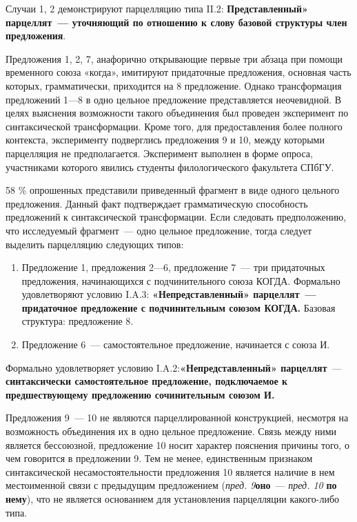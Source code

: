 \documentclass{kursa4}
\begin{document}
{      Случаи 1, 2 демонстрируют парцелляцию типа II.2: \textbf{Представленный» парцеллят~--- уточняющий по отношению к слову базовой структуры член предложения}. 

      Предложения 1, 2, 7, анафорично открывающие первые три абзаца при помощи временного союза «когда», имитируют придаточные предложения, основная часть которых, грамматически, приходится на 8 предложение. Однако трансформация предложений 1—8 в одно цельное предложение представляется неочевидной. В целях выяснения возможности такого объединения был проведен эксперимент по синтаксической трансформации. Кроме того, для предоставления более полного контекста, эксперименту подверглись предложения 9 и 10, между которыми парцелляция не предполагается. Эксперимент выполнен в форме опроса, участниками которого явились студенты филологического факультета СПбГУ. 

      58 \% опрошенных представили приведенный фрагмент в виде одного цельного предложения. Данный факт подтверждает грамматическую способность предложений к синтаксической трансформации. Если следовать предположению, что исследуемый фрагмент~--- одно цельное предложение, тогда следует выделить парцелляцию следующих типов: 

      \begin{enumerate}
        \item Предложение 1, предложения 2—6,
        предложение 7~--- три придаточных предложения, начинающихся с
        подчинительного союза КОГДА. \newline
        Формально удовлетворяют условию I.A.3: \textbf{«Непредставленный» парцеллят~--- придаточное предложение с подчинительным союзом КОГДА.} Базовая структура: предложение 8.

        \item Предложение 6~--- самостоятельное предложение, начинается с союза И.
      \end{enumerate}

      Формально удовлетворяет условию I.A.2:\textbf{«Непредставленный» парцеллят}~--- \textbf{синтаксически самостоятельное
      предложение, подключаемое к предшествующему предложению сочинительным
      союзом И.}

      Предложения 9~--- 10 не являются парцеллированной конструкцией, несмотря на возможность объединения их в
      одно цельное предложение. Связь между ними является бессоюзной,
      предложение 10 носит характер пояснения причины того, о чем говорится в
      предложении 9. Тем не менее, единственным признаком синтаксической
      несамостоятельности предложения 10 является наличие в нем местоименной
      связи с предыдущим предложением
      (\textit{пред. 9}\textbf{оно}~--- \textit{пред. 10}{
      }\textbf{{по
      нему}}{), что не является основанием для
      установления парцелляции какого-либо типа.}

}
\end{document}
